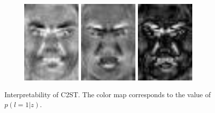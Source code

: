 \documentclass[a4paper]{article}
\begin{document}
\begin{figure}
\begin{center}
\begin{subfigure}{0.18\textwidth}
      \includegraphics[width=0.32\textwidth]{figures/faces_diff_happy.jpg}%
      \includegraphics[width=0.32\textwidth]{figures/faces_diff_angry.jpg}%
      \includegraphics[width=0.32\textwidth]{figures/faces_diff_diff.jpg}
    \end{subfigure}
    \end{center}
    \vspace{-0.2cm}
    \caption{Interpretability of C2ST. The color map corresponds to the value of $p(l=1|z)$.}
    \vspace{-0.2cm}
    \label{fig:interpretability}
  \end{figure}
\end{document}
